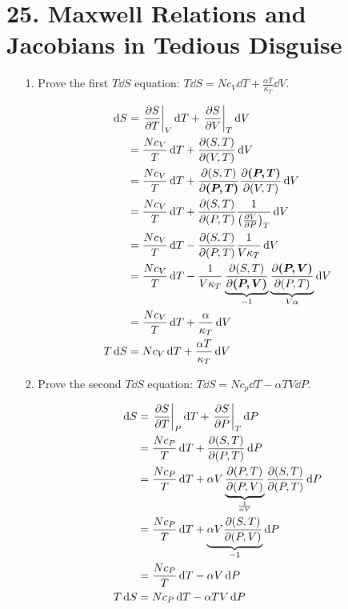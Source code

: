 \documentclass[a4paper,twoside]{article}
\begin{document}
\section*{25. Maxwell Relations and Jacobians in Tedious Disguise}
\begin{itemize}
    \item[1.] Prove the first $ T \dd{S} $ equation: $ T \dd{S} = N c_V \dd{T} + \frac{\alpha T}{\kappa_T} \dd{V} $.
        \begin{problem}
            \begin{align}
                \dd{S} &= \eval{\pdv{S}{T}}_{V} \dd{T} + \eval{\pdv{S}{V}}_{T} \dd{V} \\
                &=  \frac{N c_V}{T} \dd{T} + \pdv{(S,T)}{(V,T)} \dd{V} \\
                &= \frac{Nc_V}{T} \dd{T} + \pdv{(S,T)}{\bm{(P,T)}} \pdv{\bm{(P,T)}}{(V,T)} \dd{V} \\
                &= \frac{Nc_V}{T} \dd{T} + \pdv{(S,T)}{(P,T)} \frac{1}{\left( \pdv{V}{P} \right)_T} \dd{V} \\
                &= \frac{N c_V}{T} \dd{T} - \pdv{(S,T)}{(P,T)} \frac{1}{V \kappa_T} \dd{V} \\
                &= \frac{N c_V}{T} \dd{T} - \frac{1}{V \kappa_T} \underbrace{\pdv{(S,T)}{\bm{(P,V)}}}_{-1} \underbrace{\pdv{\bm{(P,V)}}{(P,T)}}_{V \alpha} \dd{V} \\
                &= \frac{N c_V}{T} \dd{T} + \frac{\alpha}{\kappa_T} \dd{V} \\
                T \dd{S} &= N c_V \dd{T} + \frac{\alpha T}{\kappa_T} \dd{V} 
            \end{align}
        \end{problem}
    \item[2.] Prove the second $ T \dd{S} $ equation: $ T \dd{S} = N c_p \dd{T} - \alpha TV \dd{P} $.
        \begin{problem}
            \begin{align}
                \dd{S} &= \eval{\pdv{S}{T}}_{P} \dd{T} + \eval{\pdv{S}{P}}_{T} \dd{P} \\
                &= \frac{N c_P}{T} \dd{T} + \pdv{(S,T)}{(P,T)} \dd{P} \\
                &= \frac{N c_P}{T} \dd{T} + \alpha V \underbrace{\pdv{(P,T)}{(P,V)}}_{\frac{1}{\alpha V}} \pdv{(S,T)}{(P,T)} \dd{P} \\
                &= \frac{N c_P}{T} \dd{T} + \underbrace{\alpha V \pdv{(S,T)}{(P,V)}}_{-1} \dd{P} \\
                &= \frac{N c_P}{T} \dd{T} - \alpha V \dd{P} \\
                T \dd{S} &= N c_P \dd{T} - \alpha TV \dd{P} 
            \end{align} 
        \end{problem}
\end{itemize}
\end{document}
